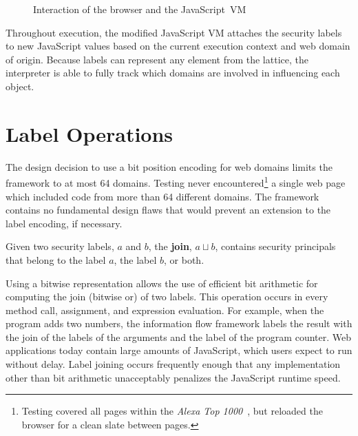 \begin{figure}[ht]
  \caption{Interaction of the browser and the JavaScript~VM}
  \label{fig:label-lattice}
\end{figure}

Throughout execution, the modified JavaScript VM attaches the security labels to new JavaScript values based on the current execution context and web domain of origin.
Because labels can represent any element from the lattice, the interpreter is able to fully track which domains are involved in influencing each object.

\section{Label Operations}

The design decision to use a bit position encoding for web domains limits the framework to at most 64 domains.
Testing never encountered\footnote{Testing covered all pages within the \textit{Alexa Top 1000}~\cite{alexa}, but reloaded the browser for a clean slate between pages.} a single web page which included code from more than 64 different domains.
The framework contains no fundamental design flaws that would prevent an extension to the label encoding, if necessary.

\begin{definition}
  Given two security labels, $a$ and $b$, the {\bf join}, $a \sqcup b$, contains security principals that belong to the label $a$, the label $b$, or both.
\end{definition}

Using a bitwise representation allows the use of efficient bit arithmetic for computing the join (bitwise or) of two labels.
This operation occurs in every method call, assignment, and expression evaluation.
For example, when the program adds two numbers, the information flow framework labels the result with the join of the labels of the arguments and the label of the program counter.
Web applications today contain large amounts of JavaScript, which users expect to run without delay.
Label joining occurs frequently enough that any implementation other than bit arithmetic unacceptably penalizes the JavaScript runtime speed.

